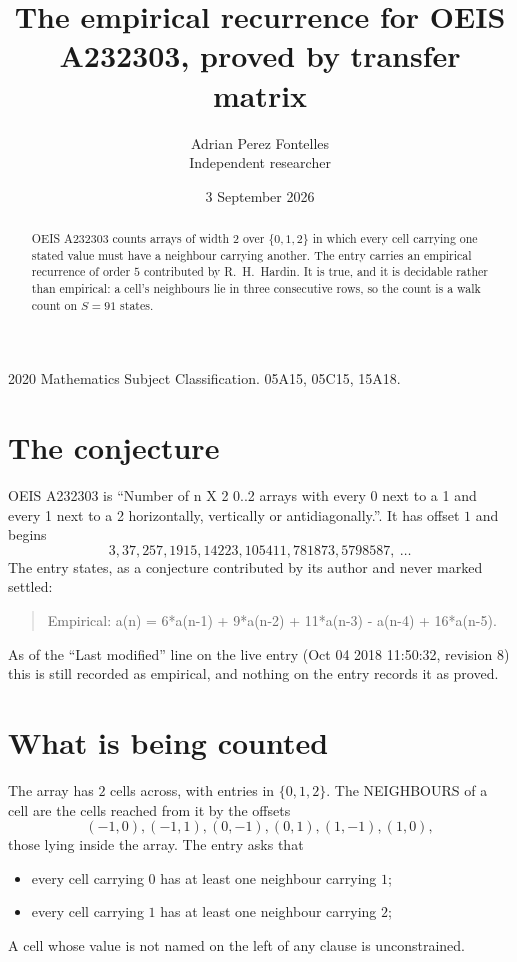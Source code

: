 \documentclass[11pt,a4paper]{article}
\title{The empirical recurrence for OEIS A232303, proved by transfer matrix}
\author{Adrian Perez Fontelles\\ \small Independent researcher}
\date{3 September 2026}
\theoremstyle{plain}
\theoremstyle{definition}
\begin{document}
\maketitle

\begin{abstract}
OEIS A232303 counts arrays of width $2$ over $\{0,1,2\}$ in which every cell carrying one stated
value must have a neighbour carrying another. The entry carries an empirical recurrence of
order $5$ contributed by R.~H.~Hardin. It is true, and it is decidable rather than
empirical: a cell's neighbours lie in three consecutive rows, so the count is a walk count on
$S=91$ states.
\end{abstract}

\noindent\small 2020 Mathematics Subject Classification. 05A15, 05C15, 15A18.\normalsize

\section{The conjecture}

OEIS A232303 is ``Number of n X 2 0..2 arrays with every 0 next to a 1 and every 1 next to a 2 horizontally, vertically or antidiagonally.''. It has offset $1$ and begins
\[
3, 37, 257, 1915, 14223, 105411, 781873, 5798587,\ \dots
\]
The entry states, as a conjecture contributed by its author and never marked settled:
\begin{quote}
Empirical: a(n) = 6*a(n-1) + 9*a(n-2) + 11*a(n-3) - a(n-4) + 16*a(n-5).
\end{quote}
As of the ``Last modified'' line on the live entry (Oct 04 2018 11:50:32, revision 8) this is still
recorded as empirical, and nothing on the entry records it as proved.

\section{What is being counted}

The array has $2$ cells across, with entries in $\{0,1,2\}$. The NEIGHBOURS of a cell are the
cells reached from it by the offsets
\[
(-1,0), (-1,1), (0,-1), (0,1), (1,-1), (1,0),
\]
those lying inside the array. The entry asks that
\begin{itemize}
\item every cell carrying $0$ has at least one neighbour carrying $1$;
\item every cell carrying $1$ has at least one neighbour carrying $2$;

\end{itemize}
A cell whose value is not named on the left of any clause is unconstrained.
\end{document}
